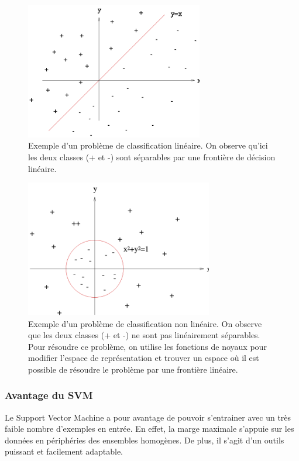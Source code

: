 \begin{figure}[h]
	\centering\includegraphics[height=6cm]{images/svm_regression.png}
	\caption[Exemple d'un problème de classification linéaire]{Exemple d'un problème de classification linéaire. On observe qu'ici les deux classes (+ et -) sont séparables par une frontière de décision linéaire. }
	\label{fig:Svm: Exemple d'un problème de classification linéaire}
\end{figure}

\begin{figure}[h]
	\centering\includegraphics[height=6cm]{images/svm_cercle.png}
	\caption[Exemple d'un problème de classification non linéaire]{Exemple d'un problème de classification non linéaire. On observe que les deux classes (+ et -) ne sont pas linéairement séparables. Pour résoudre ce problème, on utilise les fonctions de noyaux pour modifier l'espace de représentation et trouver un espace où il est possible de résoudre le problème par une frontière linéaire.}
	\label{fig:Svm: Exemple d'un problème de classification non linéaire}
\end{figure}

\subsubsection{Avantage du SVM}
\label{Le Machine Learning: Les différents algorithmes: SVM: Avantage du SVM}
Le Support Vector Machine a pour avantage de pouvoir s'entrainer avec un très faible nombre d'exemples en entrée. En effet, la marge maximale s'appuie sur les données en périphéries des ensembles homogènes. De plus, il s'agit d'un outils puissant et facilement adaptable.

